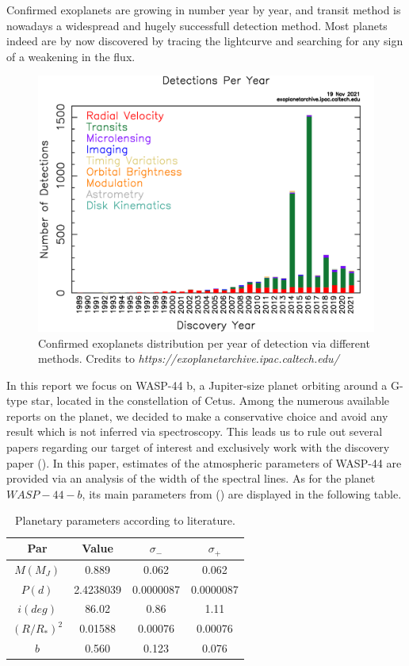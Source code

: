 \documentclass[a4paper,11pt,twocolumn]{article}
\begin{document}
Confirmed exoplanets are growing in number year by year, and transit method 
is nowadays a widespread and hugely successfull detection method. Most planets indeed are by now discovered 
by tracing the lightcurve and searching for any sign of a weakening in the 
flux.
\begin{figure}[H]
    \centering  
    \includegraphics[scale=0.15, angle=0]{../pictures/exo_dischist.png}
    \caption{Confirmed exoplanets distribution per year of detection via different methods. Credits to \textit{https://exoplanetarchive.ipac.caltech.edu/}}
\end{figure}
In this report we focus on WASP-44 b, a Jupiter-size planet orbiting around 
a G-type star, located in the constellation of Cetus.
Among the numerous available reports on the planet, we decided to make a 
conservative choice and avoid any result which is not inferred via 
spectroscopy. This leads us to rule out several papers regarding our target of interest and exclusively
 work with the discovery paper (\cite{Anderson}). In this paper, estimates 
of the atmospheric parameters of WASP-44 are provided via an analysis of 
the width of the spectral lines.
As for the planet $WASP-44-b$, its main parameters from (\cite{Anderson})
are displayed in the following table. 
\begin{table}[H]
    \centering
        \begin{tabular}{cccc}
        \hline
        Par & Value & $\sigma_{-}$ & $\sigma_{+}$\\
        \hline
        $M (M_J)$ & 0.889 & 0.062 & 0.062 \\
        $P (d)$ & 2.4238039 & 0.0000087 & 0.0000087 \\
        $i (deg)$ & 86.02 & 0.86 & 1.11 \\
        $(R/R_{*})^2$ & 0.01588 & 0.00076 & 0.00076 \\
        $b$ & 0.560 & 0.123 & 0.076 \\
        \hline
        \end{tabular}
         \caption{Planetary parameters according to literature.}
    \label{table:0}
    \end{table}
\end{document}
